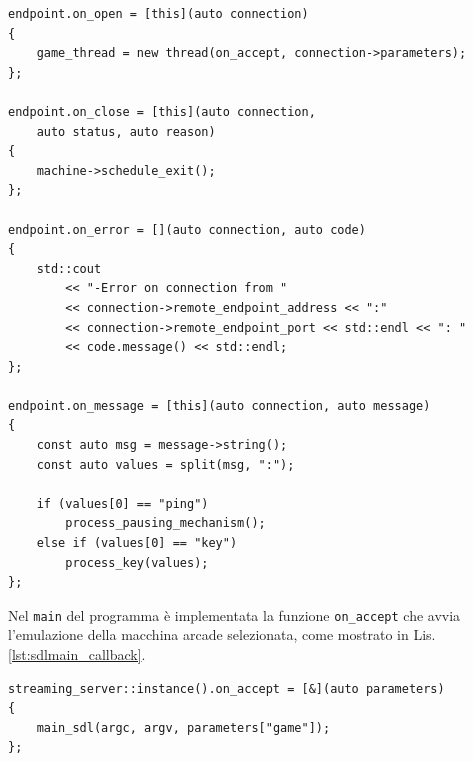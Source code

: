 \begin{lstlisting}[caption=Codice relativo alle callback WebSocket. File: \detokenize{lib/util/streaming_server.hpp}, label={lst:SocketServer_AllCallbacks}]
endpoint.on_open = [this](auto connection)
{
	game_thread = new thread(on_accept, connection->parameters);
};

endpoint.on_close = [this](auto connection,
	auto status, auto reason)
{
	machine->schedule_exit();
};	

endpoint.on_error = [](auto connection, auto code)
{
	std::cout
		<< "-Error on connection from "
		<< connection->remote_endpoint_address << ":"
		<< connection->remote_endpoint_port << std::endl << ": "
		<< code.message() << std::endl;
};

endpoint.on_message = [this](auto connection, auto message)
{
	const auto msg = message->string();
	const auto values = split(msg, ":");

	if (values[0] == "ping")
		process_pausing_mechanism();
	else if (values[0] == "key")
		process_key(values);
};
\end{lstlisting}

Nel \verb|main| del programma è implementata la funzione \verb|on_accept| che avvia l'emulazione della macchina arcade selezionata, come mostrato in Lis. \ref{lst:sdlmain_callback}.

\begin{lstlisting}[caption=Codice relativo alla callback di avvenuta connessione. File: osd/sdl/sdlmain.cpp, label={lst:sdlmain_callback}]
streaming_server::instance().on_accept = [&](auto parameters)
{
	main_sdl(argc, argv, parameters["game"]);
};
\end{lstlisting}

